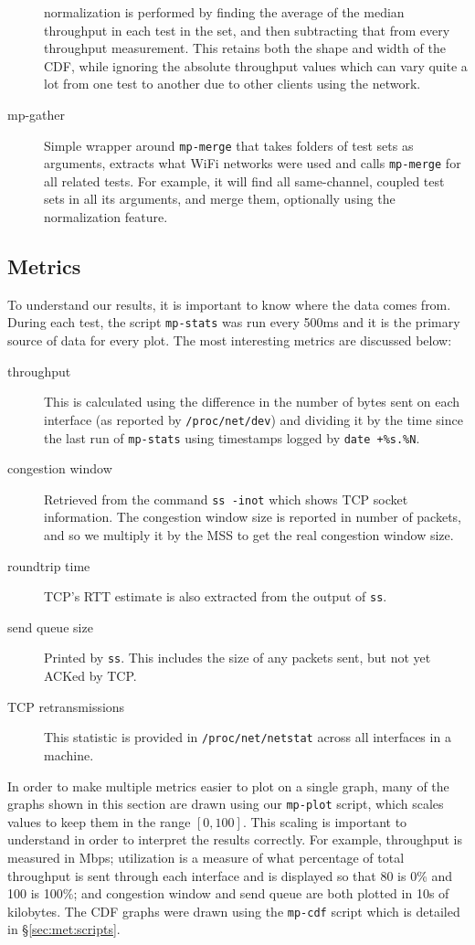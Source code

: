 \begin{description}
    normalization is performed by finding the average of the median throughput
    in each test in the set, and then subtracting that from every throughput
    measurement. This retains both the shape and width of the CDF, while
    ignoring the absolute throughput values which can vary quite a lot from one
    test to another due to other clients using the network.
  \item[mp-gather]
    Simple wrapper around \texttt{mp-merge} that takes folders of test sets as
    arguments, extracts what WiFi networks were used and calls \texttt{mp-merge}
    for all related tests. For example, it will find all same-channel, coupled
    test sets in all its arguments, and merge them, optionally using the
    normalization feature.
\end{description}

\subsection{Metrics}
\label{sec:met:metrics}
To understand our results, it is important to know where the data comes from.
During each test, the script \texttt{mp-stats} was run every 500ms and it is the
primary source of data for every plot. The most interesting metrics are
discussed below:

\begin{description}
  \item[throughput]
    This is calculated using the difference in the number of bytes sent on each
    interface (as reported by \texttt{/proc\-/net/\-dev}) and dividing it by the
    time since the last run of \texttt{mp-stats} using timestamps logged by
    \texttt{date +\%s.\%N}.
  \item[congestion window]
    Retrieved from the command \texttt{ss -inot} which shows TCP socket
    information. The congestion window size is reported in number of packets,
    and so we multiply it by the MSS to get the real congestion window size.
  \item[roundtrip time]
    TCP's RTT estimate is also extracted from the output of \texttt{ss}.
  \item[send queue size]
    Printed by \texttt{ss}. This includes the size of any packets sent, but not
    yet ACKed by TCP.
  \item[TCP retransmissions]
    This statistic is provided in \texttt{/proc\-/net/\-netstat} across all
    interfaces in a machine.
\end{description}

In order to make multiple metrics easier to plot on a single graph, many of the
graphs shown in this section are drawn using our \texttt{mp-plot} script, which
scales values to keep them in the range $[0,100]$. This scaling is important to
understand in order to interpret the results correctly. For example, throughput
is measured in Mbps; utilization is a measure of what percentage of total
throughput is sent through each interface and is displayed so that 80 is 0\% and
100 is 100\%; and congestion window and send queue are both plotted in 10s of
kilobytes. The CDF graphs were drawn using the \texttt{mp-cdf} script which is
detailed in \S\ref{sec:met:scripts}.
